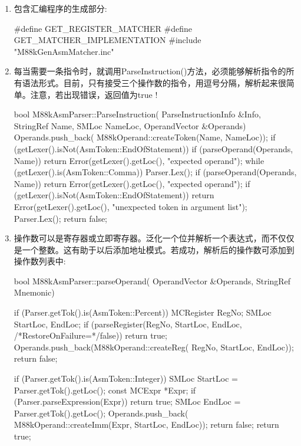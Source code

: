 \begin{enumerate}
\item
包含汇编程序的生成部分:

\begin{cpp}
#define GET_REGISTER_MATCHER
#define GET_MATCHER_IMPLEMENTATION
#include "M88kGenAsmMatcher.inc"
\end{cpp}

\item
每当需要一条指令时，就调用ParseInstruction()方法，必须能够解析指令的所有语法形式。目前，只有接受三个操作数的指令，用逗号分隔，解析起来很简单。注意，若出现错误，返回值为true !

\begin{cpp}
bool M88kAsmParser::ParseInstruction(
        ParseInstructionInfo &Info, StringRef Name,
        SMLoc NameLoc, OperandVector &Operands) {
    Operands.push_back(
        M88kOperand::createToken(Name, NameLoc));
    if (getLexer().isNot(AsmToken::EndOfStatement)) {
        if (parseOperand(Operands, Name)) {
            return Error(getLexer().getLoc(),
                         "expected operand");
        }
        while (getLexer().is(AsmToken::Comma)) {
            Parser.Lex();
            if (parseOperand(Operands, Name)) {
                return Error(getLexer().getLoc(),
                "expected operand");
            }
        }
        if (getLexer().isNot(AsmToken::EndOfStatement))
            return Error(getLexer().getLoc(),
                "unexpected token in argument list");
    }
    Parser.Lex();
    return false;
}
\end{cpp}

\item
操作数可以是寄存器或立即寄存器。泛化一个位并解析一个表达式，而不仅仅是一个整数。这有助于以后添加地址模式。若成功，解析后的操作数可添加到操作数列表中:

\begin{cpp}
bool M88kAsmParser::parseOperand(
        OperandVector &Operands, StringRef Mnemonic) {
    if (Parser.getTok().is(AsmToken::Percent)) {
        MCRegister RegNo;
        SMLoc StartLoc, EndLoc;
        if (parseRegister(RegNo, StartLoc, EndLoc,
                        /*RestoreOnFailure=*/false))
            return true;
        Operands.push_back(M88kOperand::createReg(
            RegNo, StartLoc, EndLoc));
        return false;
    }

    if (Parser.getTok().is(AsmToken::Integer)) {
        SMLoc StartLoc = Parser.getTok().getLoc();
        const MCExpr *Expr;
        if (Parser.parseExpression(Expr))
            return true;
        SMLoc EndLoc = Parser.getTok().getLoc();
        Operands.push_back(
            M88kOperand::createImm(Expr, StartLoc, EndLoc));
        return false;
    }
    return true;
}
\end{cpp}


\end{enumerate}
